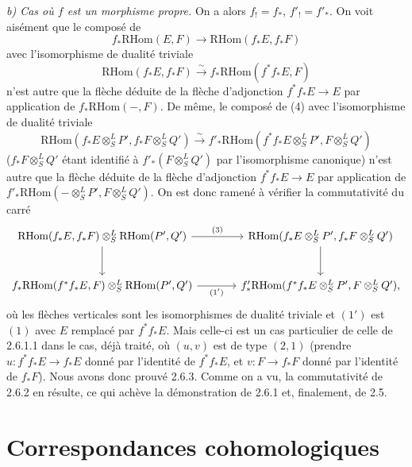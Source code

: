 \documentclass[11pt]{article}
\providecommand{\RHom}{\mathrm{RHom}}
\providecommand{\RHom}{\mathrm{RHom}}
\begin{document}
\emph{b) Cas où $f$ est un morphisme propre.} On a alors $f_!=f_*$, $f'_!=f'_*$. On voit aisément que le composé de
\[
f_*\RHom(E,F)\longrightarrow\RHom(f_*E,f_*F)
\]
avec l'isomorphisme de dualité triviale
\[
\RHom(f_*E,f_*F)\xrightarrow{\sim}f_*\RHom(f^{*}f_*E,F)
\]
n'est autre que la flèche déduite de la flèche d'adjonction $f^{*}f_*E\to E$ par application de $f_*\RHom(-,F)$. De même, le composé de (4) avec l'isomorphisme de dualité triviale
\[
\RHom(f_*E\otimes^L_SP',f_*F\otimes^L_SQ')\xrightarrow{\sim}f'_*\RHom(f^{*}f_*E\otimes^L_SP',F\otimes^L_SQ')
\]
($f_*F\otimes^L_SQ'$ étant identifié à $f'_*(F\otimes^L_SQ')$ par l'isomorphisme canonique) n'est autre que la flèche déduite de la flèche d'adjonction $f^{*}f_*E\to E$ par application de $f'_*\RHom(-\otimes^L_SP',F\otimes^L_SQ')$. On est donc ramené à vérifier la commutativité du carré
\[
\begin{tikzcd}[column sep=large,row sep=large]
\RHom(f_*E,f_*F)\otimes^L_S\RHom(P',Q') \arrow[r,"(3)"] \arrow[d] & \RHom(f_*E\otimes^L_SP',f_*F\otimes^L_SQ') \arrow[d]\\
f_*\RHom(f^{*}f_*E,F)\otimes^L_S\RHom(P',Q') \arrow[r,"(1')"'] & f'_*\RHom(f^{*}f_*E\otimes^L_SP',F\otimes^L_SQ'),
\end{tikzcd}
\]
où les flèches verticales sont les isomorphismes de dualité triviale et $(1')$ est $(1)$ avec $E$ remplacé par $f^{*}f_*E$. Mais celle-ci est un cas particulier de celle de 2.6.1.1 dans le cas, déjà traité, où $(u,v)$ est de type $(2,1)$ (prendre $u:f^{*}f_*E\to f_*E$ donné par l'identité de $f^{*}f_*E$, et $v:F\to f_*F$ donné par l'identité de $f_*F$). Nous avons donc prouvé 2.6.3. Comme on a vu, la commutativité de 2.6.2 en résulte, ce qui achève la démonstration de 2.6.1 et, finalement, de 2.5.

\clearpage
\section{Correspondances cohomologiques}
\end{document}

